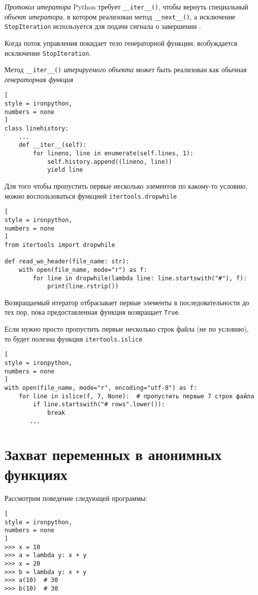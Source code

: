 \documentclass[%
	11pt,
	a4paper,
	utf8,
		]{article}
\begin{document}
\emph{Протокол итератора} Python требует \verb|__iter__()|, чтобы вернуть специальный \emph{объект итератора}, в котором реализован метод \verb|__next__()|, а исключение \texttt{StopIteration} используется для подачи сигнала о завершении \cite[]{beazley:python_cookbook-2019}.

Когда поток управления покидает тело генераторной функции, возбуждается исключение \texttt{StopIteration}.

Метод \verb|__iter__()| \emph{итерируемого объекта} может быть реализован как обычная \emph{генераторная функция} \cite[]{beazley:python_cookbook-2019}
\begin{lstlisting}[
style = ironpython,
numbers = none
]
class linehistory:
    ...
    def __iter__(self):
        for lineno, line in enumerate(self.lines, 1):
            self.history.append((lineno, line))
            yield line
\end{lstlisting}

Для того чтобы пропустить первые несколько элементов по какому-то условию, можно воспользоваться функцией \texttt{itertools.dropwhile}
\begin{lstlisting}[
style = ironpython,
numbers = none
]
from itertools import dropwhile

def read_wo_header(file_name: str):
    with open(file_name, mode="r") as f:
        for line in dropwhile(lambda line: line.startswith("#"), f):
            print(line.rstrip())
\end{lstlisting}

Возвращаемый итератор отбрасывает первые элементы в последовательности до тех пор, пока предоставленная функция возвращает \texttt{True}.

Если нужно просто пропустить первые несколько строк файла (не по условию), то будет полезна функция \texttt{itertools.islice}
\begin{lstlisting}[
style = ironpython,
numbers = none
]
with open(file_name, mode="r", encoding="utf-8") as f:
    for line in islice(f, 7, None):  # пропустить первые 7 строк файла
        if line.startswith("# rows".lower()):
            break
       ...
\end{lstlisting}

\section{Захват переменных в анонимных функциях}

Рассмотрим поведение следующей программы:
\begin{lstlisting}[
style = ironpython,
numbers = none
]
>>> x = 10
>>> a = lambda y: x + y
>>> x = 20
>>> b = lambda y: x + y
>>> a(10)  # 30
>>> b(10)  # 30
\end{lstlisting}
\end{document}
